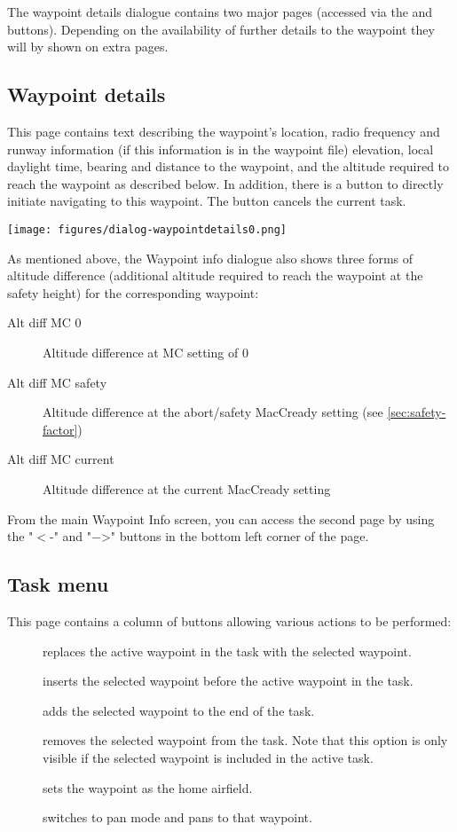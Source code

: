 The waypoint details dialogue contains two major pages (accessed via the
\button{$>$} and \button{$<$} buttons). Depending on the availability of further
details to the waypoint they will by shown on extra pages.

\subsection*{Waypoint details}\label{sec:waypointdetails}
This page contains text describing the waypoint's location, radio frequency and 
runway information (if this information is in the waypoint file) elevation, 
local daylight time, bearing and distance to the waypoint, and the altitude required 
to reach the waypoint as described below. In addition, there is a button 
 to directly initiate
navigating to this waypoint. The button cancels the current task. 
\begin{center}
\texttt{[image: figures/dialog-waypointdetails0.png]}
\end{center}

As mentioned above, the Waypoint info dialogue also shows three forms of altitude 
difference (additional
altitude required to reach the waypoint at the safety height) for
the corresponding waypoint:
\begin{description}
\item[Alt diff MC 0] Altitude difference at MC setting of 0
\item[Alt diff MC safety] Altitude difference at the abort/safety MacCready 
  setting (see \ref{sec:safety-factor})
\item[Alt diff MC current] Altitude difference at the current MacCready setting
\end{description}

From the main Waypoint Info screen, you can access the second page by using the 
"$<$-" and "$-$>" buttons in the bottom left corner of the page.
\subsection*{Task menu}  
This page contains a column of buttons allowing various actions to be performed:
\begin{description}
\item[] replaces the active waypoint in the task with 
  the selected waypoint.
\item[] inserts the selected waypoint before the active 
  waypoint in
  the task.
\item[] adds the selected waypoint to the end of the task.
\item[] removes the selected waypoint from the task.  
  Note that this option is only visible if the selected waypoint is included in 
  the active task.
\item[] sets the waypoint as the home airfield.
\item[] switches to pan mode and pans to that waypoint.
\end{description}

